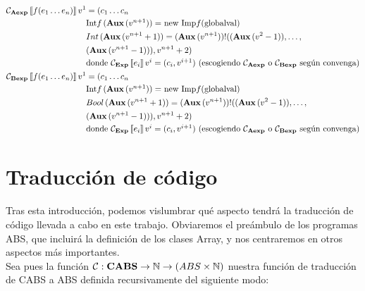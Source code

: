 \begin{align*}
  \mathcal{C}_{\textbf{Aexp}}\left\llbracket f(e_1 \dots e_n) \right\rrbracket v^{1} &= (c_1 \dots c_n\\
  &\mbox{Int$f\,(\textbf{Aux}\, (v^{n+1})) =$ new Imp$f($globalval$)$} \\
  &Int\, (\textbf{Aux}\, (v^{n+1} + 1)) = (\textbf{Aux}\, (v^{n+1}))!((\textbf{Aux}\, (v^{2} - 1)), \dots,\\
  &(\textbf{Aux}\, (v^{n+1} - 1))), v^{n+1} + 2) \\
  &\mbox{donde $\mathcal{C}_{\textbf{Exp}}\left\llbracket e_i \right\rrbracket v^{i} = (c_i, v^{i+1})$ (escogiendo $\mathcal{C}_{\textbf{Aexp}}$ o $\mathcal{C}_{\textbf{Bexp}}$ según convenga)} \\
  \mathcal{C}_{\textbf{Bexp}}\left\llbracket f(e_1 \dots e_n) \right\rrbracket v^{1} &= (c_1 \dots c_n\\
  &\mbox{Int$f\,(\textbf{Aux}\, (v^{n+1})) =$ new Imp$f($globalval$)$} \\
  &Bool\, (\textbf{Aux}\, (v^{n+1} + 1)) = (\textbf{Aux}\, (v^{n+1}))!((\textbf{Aux}\, (v^{2} - 1)), \dots,\\
  &(\textbf{Aux}\, (v^{n+1} - 1))), v^{n+1} + 2) \\
  &\mbox{donde $\mathcal{C}_{\textbf{Exp}}\left\llbracket e_i \right\rrbracket v^{i} = (c_i, v^{i+1})$ (escogiendo $\mathcal{C}_{\textbf{Aexp}}$ o $\mathcal{C}_{\textbf{Bexp}}$ según convenga)} \\
\end{align*}

\section{Traducción de código}

Tras esta introducción, podemos vislumbrar qué aspecto tendrá la traducción de código llevada a cabo en este trabajo. Obviaremos el preámbulo de los programas ABS, que incluirá la definición de los clases Array, y nos centraremos en otros aspectos más importantes.\\

Sea pues la función $\mathcal{C}: \textbf{CABS} \rightarrow \mathbb{N} \rightarrow (ABS \times \mathbb{N})$ nuestra función de traducción de CABS a ABS definida recursivamente del siguiente modo:

